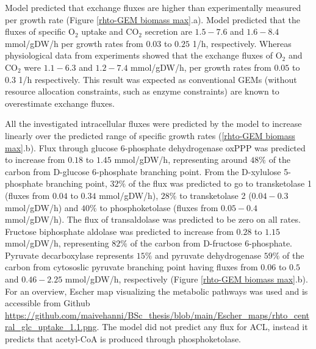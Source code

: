 Model predicted that exchange fluxes are higher than experimentally measured per growth rate (Figure \ref{rhto-GEM biomass max}.a). Model predicted that the fluxes of specific O$_2$ uptake and CO$_2$ secretion are $1.5-7.6$ and $1.6-8.4$ \unit{mmol/gDW/h} per growth rates from $0.03$ to $0.25$ \unit{1/h}, respectively. Whereas physiological data from experiments showed that the exchange fluxes of O$_2$ and CO$_2$ were $1.1-6.3$ and $1.2-7.4$ \unit{mmol/gDW/h}, per growth rates from $0.05$ to $0.3$ \unit{1/h} respectively. 
This result was expected as conventional GEMs (without resource allocation constraints, such as enzyme constraints) are known to overestimate exchange fluxes. 

All the investigated intracellular fluxes were predicted by the model to increase linearly over the predicted range of specific growth rates (\ref{rhto-GEM biomass max}.b). %
Flux through glucose 6-phosphate dehydrogenase oxPPP was predicted to increase from $0.18$ to $1.45$ \unit{mmol/gDW/h}, representing around $48\%$ of the carbon from 
D-glucose 6-phosphate branching point. From the D-xylulose 5-phosphate branching point, $32\%$ of the flux was 
predicted to go to transketolase 1 (fluxes from $0.04$ to $0.34$ \unit{mmol/gDW/h}), $28\%$ to 
transketolase 2 ($0.04-0.3$ \unit{mmol/gDW/h}) and $40\%$ to phosphoketolase (fluxes from $0.05-0.4$ \unit{mmol/gDW/h}). 
The flux of transaldolase was predicted to be zero on all rates. Fructose biphosphate aldolase was predicted to increase from 
$0.28$ to $1.15$ \unit{mmol/gDW/h}, representing $82\%$ of the carbon from D-fructose 6-phosphate. 
Pyruvate decarboxylase represents $15\%$ and pyruvate dehydrogenase $59\%$ of the carbon from %
cytososlic pyruvate branching point having fluxes from $0.06$ to $0.5$ and $0.46-2.25$ \unit{mmol/gDW/h}, respectively (Figure \ref{rhto-GEM biomass max}.b). For an overview, Escher \cite{King2015a} map visualizing the metabolic pathways was used and is accessible from Github \url{https://github.com/maivehanni/BSc_thesis/blob/main/Escher_maps/rhto_central_glc_uptake_1.1.png}.
The model did not predict any flux for ACL, instead it predicts that acetyl-CoA is produced through phosphoketolase. %
